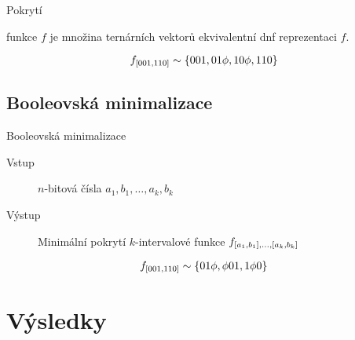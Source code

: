 \documentclass{beamer}
\theoremstyle{remark}
\begin{document}
\begin{frame}{Pokrytí}
\begin{definition}[Pokrytí]
 funkce $f$ je množina ternárních vektorů ekvivalentní \acrshort{dnf} reprezentaci $f$.
\end{definition}

\begin{example}[Pokrytí]
$$
f_{[001, 110]} \sim \{001, 01 \phi, 10 \phi, 110\}
$$

\begin{figure}[h]
\centering

\end{figure}
\end{example}
\end{frame}

\subsection{Booleovská minimalizace}

\begin{frame}{Booleovská minimalizace}

\begin{problem}
\begin{description}
\item[Vstup]
$n$-bitová čísla
$a_1, b_1, \ldots, a_k, b_k$

\item[Výstup]
Minimální pokrytí $k$-intervalové funkce $f_{[a_1, b_1], \ldots, [a_k, b_k]}$
\end{description}
\end{problem}

\begin{example}
$$
f_{[001, 110]} \sim \{01 \phi, \phi 01, 1 \phi 0\}
$$

\begin{figure}[h]
\centering

\end{figure}
\end{example}
\end{frame}

\section{Výsledky}
\end{document}
